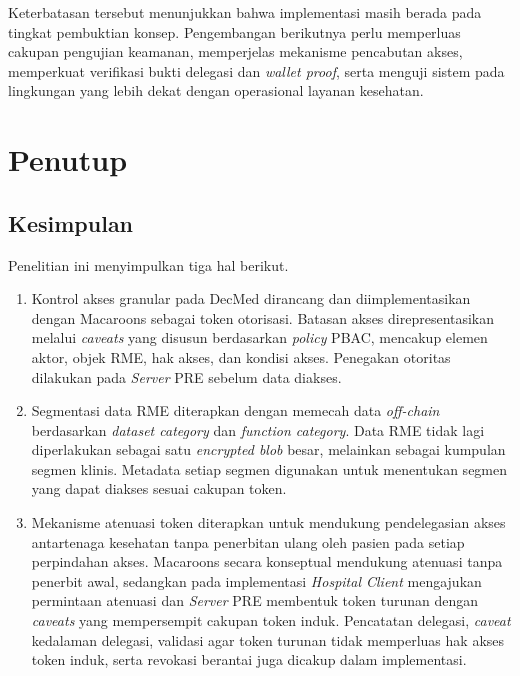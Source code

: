 \documentclass[bahasa, 12pt, a4paper, onecolumn, oneside, final]{report}
\begin{document}
Keterbatasan tersebut menunjukkan bahwa implementasi masih berada pada tingkat pembuktian konsep. Pengembangan berikutnya perlu memperluas cakupan pengujian keamanan, memperjelas mekanisme pencabutan akses, memperkuat verifikasi bukti delegasi dan \textit{wallet proof}, serta menguji sistem pada lingkungan yang lebih dekat dengan operasional layanan kesehatan.
\chapter{Penutup}
\label{chap:penutup}

\section{Kesimpulan}

Penelitian ini menyimpulkan tiga hal berikut.

\begin{enumerate}
	\item Kontrol akses granular pada DecMed dirancang dan diimplementasikan dengan Macaroons sebagai token otorisasi. Batasan akses direpresentasikan melalui \textit{caveats} yang disusun berdasarkan \textit{policy} PBAC, mencakup elemen aktor, objek RME, hak akses, dan kondisi akses. Penegakan otoritas dilakukan pada \textit{Server} PRE sebelum data diakses.

	\item Segmentasi data RME diterapkan dengan memecah data \textit{off-chain} berdasarkan \textit{dataset category} dan \textit{function category}. Data RME tidak lagi diperlakukan sebagai satu \textit{encrypted blob} besar, melainkan sebagai kumpulan segmen klinis. Metadata setiap segmen digunakan untuk menentukan segmen yang dapat diakses sesuai cakupan token.

	\item Mekanisme atenuasi token diterapkan untuk mendukung pendelegasian akses antartenaga kesehatan tanpa penerbitan ulang oleh pasien pada setiap perpindahan akses. Macaroons secara konseptual mendukung atenuasi tanpa penerbit awal, sedangkan pada implementasi \textit{Hospital Client} mengajukan permintaan atenuasi dan \textit{Server} PRE membentuk token turunan dengan \textit{caveats} yang mempersempit cakupan token induk. Pencatatan delegasi, \textit{caveat} kedalaman delegasi, validasi agar token turunan tidak memperluas hak akses token induk, serta revokasi berantai juga dicakup dalam implementasi.
\end{enumerate}
\end{document}
